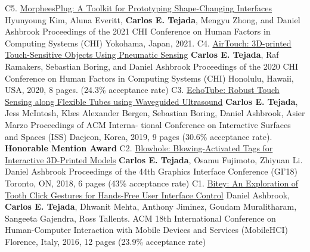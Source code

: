 


    \begin{cvpublications}
      \cvpublication%
        {C5.}%
        {\href{https://doi.org/10.1145/3313831.3376136}{MorpheesPlug: A Toolkit for Prototyping Shape-Changing Interfaces}}%
        {Hyunyoung Kim, Aluna Everitt, \textbf{Carlos E. Tejada}, Mengyu Zhong, and Daniel Ashbrook}%
        {Proceedings of the 2021 CHI Conference on Human Factors in Computing Systems (CHI)}%
        {Yokohama, Japan, 2021.}
      \cvpublication%
        {C4.}%
        {\href{https://doi.org/10.1145/3313831.3376136}{AirTouch: 3D-printed Touch-Sensitive Objects Using Pneumatic Sensing}}%
        {\textbf{Carlos E. Tejada}, Raf Ramakers, Sebastian Boring, and Daniel Ashbrook}%
        {Proceedings of the 2020 CHI Conference on Human Factors in Computing Systems (CHI)}%
        {Honolulu, Hawaii, USA, 2020, 8 pages. (24.3\% acceptance rate)}
      \cvpublication%
        {C3.}
        {\href{https://doi.org/10.1145/3343055.3359712}{EchoTube: Robust Touch Sensing along Flexible Tubes using Waveguided Ultrasound}}%
        {\textbf{Carlos E. Tejada}, Jess McIntosh, Klæs Alexander Bergen, Sebastian Boring, Daniel Ashbrook, Asier Marzo}%
        {Proceedings of ACM Interna- tional Conference on Interactive Surfaces and Spaces (ISS)}%
        {Daejeon, Korea, 2019, 9 pages (30.6\% acceptance rate). \bf Honorable Mention Award}
      \cvpublication%
        {C2.}%
        {\href{https://doi.org/10.20380/GI2018.18}{Blowhole: Blowing-Activated Tags for Interactive 3D-Printed Models}}%
        {\textbf{Carlos E. Tejada}, Osamu Fujimoto, Zhiyuan Li. Daniel Ashbrook}%
        {Proceedings of the 44th Graphics Interface Conference (GI’18)}%
        {Toronto, ON, 2018, 6 pages (43\% acceptance rate)}
      \cvpublication%
        {C1.}%
        {\href{https://doi.org/10.1145/2935334.2935389}{Bitey: An Exploration of Tooth Click Gestures for Hands-Free User Interface Control}}%
        {Daniel Ashbrook, \textbf{Carlos E. Tejada}, Dhwanit Mehta, Anthony Jiminez, Goudam Muralitharam, Sangeeta Gajendra, Ross Tallents.}%
        {ACM 18th International Conference on Human-Computer Interaction with Mobile Devices and Services (MobileHCI)}%
        {Florence, Italy, 2016, 12 pages (23.9\% acceptance rate)}
    \end{cvpublications}

